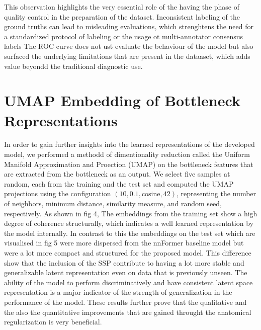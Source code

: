This observation highlights the very essential role of the having the phase of quality control in the preparation of the dataset. Inconsistent labeling of the ground truths can lead to misleading evaluations, which strenghtens the need for a standardized protocol of labeling or the usage ot multi-annotator consensus labels The ROC curve does not ust evaluate the behaviour of the model but also surfaced the underlying limitations that are present in the dataaset, which adds value beyondd the traditional diagnostic use.

\section{UMAP Embedding of Bottleneck Representations}
In order to gain further insights into the learned representations of the developed model, we performed a methodd of dimentionality reduction called the Uniform Manifold Approximation and Proection (UMAP) \cite{McInnes2018} on the bottleneck features that are extracted from the bottleneck as an output. We select five samples at random, each from the training and the test set and computed the UMAP projections using the configuration $(10, 0.1, \text{cosine}, 42)$, representing the number of neighbors, minimum distance, similarity measure, and random seed, respectively. As shown in fig 4, The embeddings from the training set show a high degree of coherence structurally, which indicates a well learned representation by the model internally. In contrast to this the embeddings on the test set which are visualised in fig 5 were more dispersed from the nnFormer baseline model but were a lot more compact and structured for the proposed model. This difference show that the inclusion of the SSP contribute to having a lot more stable and generalizable latent representation even on data that is previously unseen. The ability of the model to perform discriminatively and have consistent latent space representation is a major indicator of the strength of generalization in the performance of the model. These results further prove that the qualitative and the also the quantitative improvements that are gained throught the anatomical regularization is very beneficial.

